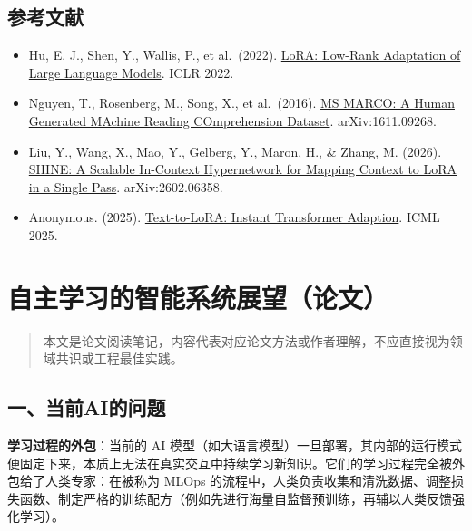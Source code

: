 \hypertarget{ux53c2ux8003ux6587ux732e-152}{%
\subsection{参考文献}\label{ux53c2ux8003ux6587ux732e-152}}

\begin{itemize}
\tightlist
\item
  Hu, E. J., Shen, Y., Wallis, P., et al.~(2022). \href{https://arxiv.org/abs/2106.09685}{LoRA: Low-Rank Adaptation of Large Language Models}. ICLR 2022.
\item
  Nguyen, T., Rosenberg, M., Song, X., et al.~(2016). \href{https://arxiv.org/abs/1611.09268}{MS MARCO: A Human Generated MAchine Reading COmprehension Dataset}. arXiv:1611.09268.
\item
  Liu, Y., Wang, X., Mao, Y., Gelberg, Y., Maron, H., \& Zhang, M. (2026). \href{https://arxiv.org/abs/2602.06358}{SHINE: A Scalable In-Context Hypernetwork for Mapping Context to LoRA in a Single Pass}. arXiv:2602.06358.
\item
  Anonymous. (2025). \href{https://arxiv.org/abs/2506.06105}{Text-to-LoRA: Instant Transformer Adaption}. ICML 2025.
\end{itemize}

\clearpage

\hypertarget{ux81eaux4e3bux5b66ux4e60ux7684ux667aux80fdux7cfbux7edfux5c55ux671bux8bbaux6587}{%
\section{自主学习的智能系统展望（论文）}\label{ux81eaux4e3bux5b66ux4e60ux7684ux667aux80fdux7cfbux7edfux5c55ux671bux8bbaux6587}}

\begin{quote}
本文是论文阅读笔记，内容代表对应论文方法或作者理解，不应直接视为领域共识或工程最佳实践。
\end{quote}

\hypertarget{ux4e00ux5f53ux524daiux7684ux95eeux9898}{%
\subsection{一、当前AI的问题}\label{ux4e00ux5f53ux524daiux7684ux95eeux9898}}

\textbf{学习过程的外包}：当前的 AI 模型（如大语言模型）一旦部署，其内部的运行模式便固定下来，本质上无法在真实交互中持续学习新知识。它们的学习过程完全被外包给了人类专家：在被称为 MLOps 的流程中，人类负责收集和清洗数据、调整损失函数、制定严格的训练配方（例如先进行海量自监督预训练，再辅以人类反馈强化学习）。

